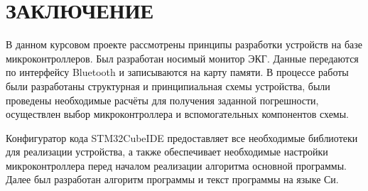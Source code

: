 \begin{sloppypar} %
\newpage %

\section*{ЗАКЛЮЧЕНИЕ} %

В данном курсовом проекте рассмотрены принципы разработки устройств на базе микроконтроллеров. Был разработан носимый монитор ЭКГ. Данные передаются по интерфейсу Bluetooth и записываются на карту памяти. В процессе работы были разработаны структурная и принципиальная схемы устройства, были проведены необходимые расчёты для получения заданной погрешности, осуществлен выбор микроконтроллера и вспомогательных компонентов схемы. 


Конфигуратор кода STM32CubeIDE предоставляет все необходимые библиотеки для реализации устройства, а также обеспечивает необходимые настройки микроконтроллера перед началом реализации алгоритма основной программы. Далее был разработан алгоритм программы и текст программы на языке Си. 


\end{sloppypar}
